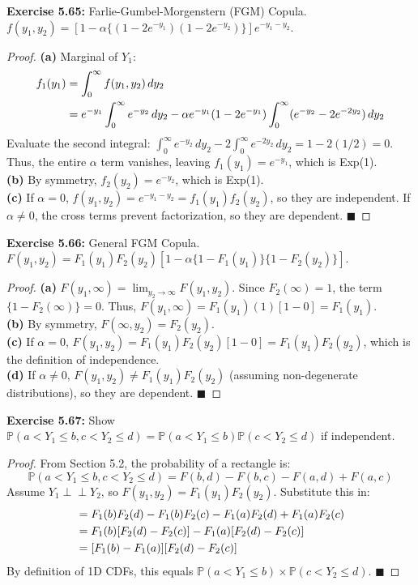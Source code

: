 \documentclass[11pt, a4paper]{article}
\theoremstyle{definition}
\theoremstyle{remark}
\newcommand{\Prob}{\mathbb{P}}
\newcommand{\indep}{\perp\!\!\!\perp}
\begin{document}
\textbf{Exercise 5.65:} Farlie-Gumbel-Morgenstern (FGM) Copula. $f(y_1, y_2) = [1 - \alpha\{(1-2e^{-y_1})(1-2e^{-y_2})\}]e^{-y_1-y_2}$.
\begin{proof}
\textbf{(a)} Marginal of $Y_1$:
\begin{align*}
f_1(y_1) &= \int_{0}^{\infty} f(y_1, y_2) \, dy_2 \\ \relax
&= e^{-y_1} \int_{0}^{\infty} e^{-y_2} \, dy_2 - \alpha e^{-y_1}(1-2e^{-y_1}) \int_{0}^{\infty} (e^{-y_2} - 2e^{-2y_2}) \, dy_2
\end{align*}
Evaluate the second integral: $\int_{0}^{\infty} e^{-y_2} \, dy_2 - 2\int_{0}^{\infty} e^{-2y_2} \, dy_2 = 1 - 2(1/2) = 0$.
Thus, the entire $\alpha$ term vanishes, leaving $f_1(y_1) = e^{-y_1}$, which is Exp(1). \\
\textbf{(b)} By symmetry, $f_2(y_2) = e^{-y_2}$, which is Exp(1). \\
\textbf{(c)} If $\alpha = 0$, $f(y_1, y_2) = e^{-y_1-y_2} = f_1(y_1)f_2(y_2)$, so they are independent. If $\alpha \neq 0$, the cross terms prevent factorization, so they are dependent. $\blacksquare$
\end{proof}

\textbf{Exercise 5.66:} General FGM Copula. $F(y_1, y_2) = F_1(y_1)F_2(y_2)[1 - \alpha\{1-F_1(y_1)\}\{1-F_2(y_2)\}]$.
\begin{proof}
\textbf{(a)} $F(y_1, \infty) = \lim_{y_2 \to \infty} F(y_1, y_2)$. Since $F_2(\infty) = 1$, the term $\{1-F_2(\infty)\} = 0$. Thus, $F(y_1, \infty) = F_1(y_1)(1)[1 - 0] = F_1(y_1)$. \\
\textbf{(b)} By symmetry, $F(\infty, y_2) = F_2(y_2)$. \\
\textbf{(c)} If $\alpha = 0$, $F(y_1, y_2) = F_1(y_1)F_2(y_2)[1 - 0] = F_1(y_1)F_2(y_2)$, which is the definition of independence. \\
\textbf{(d)} If $\alpha \neq 0$, $F(y_1, y_2) \neq F_1(y_1)F_2(y_2)$ (assuming non-degenerate distributions), so they are dependent. $\blacksquare$
\end{proof}

\textbf{Exercise 5.67:} Show $\Prob(a < Y_1 \le b, c < Y_2 \le d) = \Prob(a < Y_1 \le b)\Prob(c < Y_2 \le d)$ if independent.
\begin{proof}
From Section 5.2, the probability of a rectangle is:
\[ \Prob(a < Y_1 \le b, c < Y_2 \le d) = F(b,d) - F(b,c) - F(a,d) + F(a,c) \]
Assume $Y_1 \indep Y_2$, so $F(y_1, y_2) = F_1(y_1)F_2(y_2)$. Substitute this in:
\begin{align*}
&= F_1(b)F_2(d) - F_1(b)F_2(c) - F_1(a)F_2(d) + F_1(a)F_2(c) \\ \relax
&= F_1(b)[F_2(d) - F_2(c)] - F_1(a)[F_2(d) - F_2(c)] \\ \relax
&= [F_1(b) - F_1(a)][F_2(d) - F_2(c)]
\end{align*}
By definition of 1D CDFs, this equals $\Prob(a < Y_1 \le b) \times \Prob(c < Y_2 \le d)$. $\blacksquare$
\end{proof}
\end{document}
